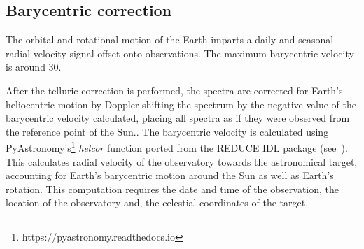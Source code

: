 

\subsection{Barycentric correction}
The orbital and rotational motion of the Earth imparts a daily and seasonal radial velocity signal offset onto observations. The maximum barycentric velocity is around 30\kmps.

After the telluric correction is performed, the spectra are corrected for Earth's heliocentric motion by Doppler shifting the spectrum by the negative value of the barycentric velocity calculated, placing all spectra as if they were observed from the reference point of the Sun.. The barycentric velocity is calculated using PyAstronomy's\footnote{https://pyastronomy.readthedocs.io} \emph{helcor} function ported from the REDUCE IDL package (see~\citet[][]{piskunov_new_2002}). This calculates radial velocity of the observatory towards the astronomical target, accounting for Earth's barycentric motion around the Sun as well as Earth's rotation. This computation requires the date and time of the observation, the location of the observatory and, the celestial coordinates of the target.
